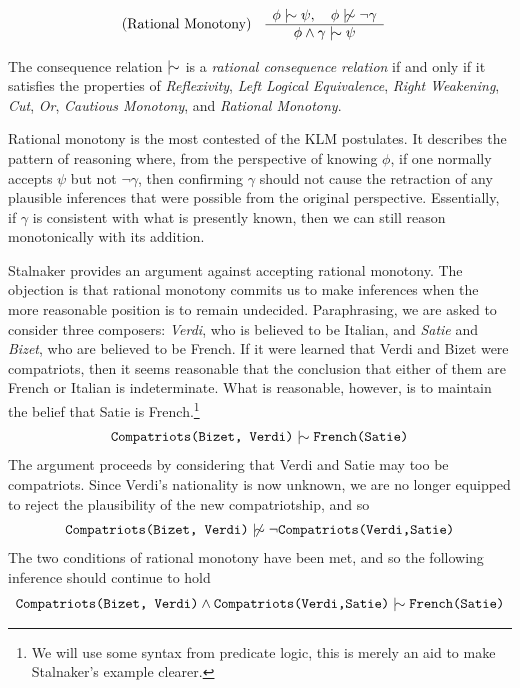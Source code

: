 \begin{align}
	\inferLeft{Rational Monotony}{\phi \twiddle \psi, \quad \phi \ntwiddle \neg \gamma}{\phi \land \gamma \twiddle \psi}
\end{align}

\begin{definition}
	\label{definition:rational-relation}

	The consequence relation $\twiddle$ is a \emph{rational consequence relation} if and only if it satisfies the properties
	of \emph{Reflexivity}, \emph{Left Logical Equivalence}, \emph{Right Weakening}, \emph{Cut}, \emph{Or}, \emph{Cautious
	Monotony}, and \emph{Rational Monotony}.
\end{definition}

Rational monotony is the most contested of the KLM postulates. It describes the pattern of reasoning where, from the
perspective of knowing $\phi$, if one normally accepts $\psi$ but not $\neg \gamma$, then confirming $\gamma$ should not
cause the retraction of any plausible inferences that were possible from the original perspective. Essentially, if
$\gamma$ is consistent with what is presently known, then we can still reason monotonically with its addition.

Stalnaker \cite{Stalnaker1994,sep-logic-nonmonotonic-Stanford} provides an argument against accepting rational monotony.
The objection is that rational monotony commits us to make inferences when the more reasonable position is to remain
undecided. Paraphrasing, we are asked to consider three composers: \textit{Verdi}, who is believed to be Italian, and
\textit{Satie} and \textit{Bizet}, who are believed to be French. If it were learned that Verdi and Bizet were
compatriots, then it seems reasonable that the conclusion that either of them are French or Italian is indeterminate.
What is reasonable, however, is to maintain the belief that Satie is French.\footnote{We will use some syntax from
predicate logic, this is merely an aid to make Stalnaker's example clearer.}
\begin{align}
	\texttt{Compatriots(Bizet, Verdi)}\twiddle \texttt{French(Satie)}
\end{align}
The argument proceeds by considering that Verdi and Satie may too be compatriots. Since Verdi's nationality is now unknown,
we are no longer equipped to reject the plausibility of the new compatriotship, and so
\begin{align}
	\texttt{Compatriots(Bizet, Verdi)}\ntwiddle \neg \texttt{Compatriots(Verdi,Satie)}
\end{align}
The two conditions of rational monotony have been met, and so the following inference should continue to hold
\begin{align}
	\texttt{Compatriots(Bizet, Verdi)}\land \texttt{Compatriots(Verdi,Satie)}\twiddle \texttt{French(Satie)}
\end{align}

